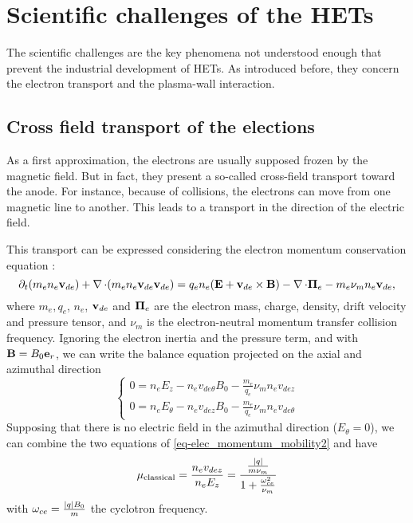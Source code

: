 
\section*{Scientific challenges of the HETs}

The scientific challenges are the key phenomena not understood enough that prevent the industrial development of \ac{HET}s.
As introduced before, they concern the electron transport and the plasma-wall interaction.

\subsection*{Cross field transport of the elections}

  \label{sec-mob}
  As a first approximation, the electrons are usually supposed frozen by the magnetic field.
  But in fact, they present a so-called cross-field transport toward the anode.
  For instance, because of collisions, the electrons can move from one magnetic line to another.
  This leads to a transport in the direction of the electric field.
  
  This transport can be expressed considering the electron momentum conservation equation \citep{lafleur2016a}\string:
  \begin{equation} \label{eq-elec_momentum_mobility}
    \partial_t(m_e n_e {\mathbf v}_{de}) + \operatorname{{\mathbf \nabla}} \cdot (m_e n_e  {\mathbf v}_{de} {\mathbf v}_{de}) = q_e n_e ( {\mathbf E} + {\mathbf v}_{de} \times {\mathbf B}) - \operatorname{{\mathbf \nabla}} \cdot {\mathbf \Pi}_e - m_e \nu_m n_e {\mathbf v}_{de},
  \end{equation}
  where $m_e, q_e$, $n_e$, ${\mathbf v}_{de}$ and ${\mathbf \Pi}_e $ are the electron mass, charge, density, drift velocity and pressure tensor, and $\nu_m$ is the electron-neutral momentum transfer collision frequency.
  Ignoring the electron inertia and the pressure term, and with ${\mathbf B} = B_0 {\mathbf e}_r$, we can write the balance equation projected on the axial and azimuthal direction
  \begin{equation} \label{eq-elec_momentum_mobility2}
  \begin{cases}
    0 =  n_e E_z - n_e v_{de{\theta}} B_0 - \frac{m_e}{q_e} \nu_m n_e v_{dez}\\
    0 =  n_e E_{\theta} -  n_e v_{dez} B_0 - \frac{m_e}{q_e} \nu_m n_e v_{de{\theta}}
  \end{cases}
  \end{equation}
  Supposing that there is no electric field in the azimuthal direction ($E_{\theta}=0$),  we can combine the two equations of \cref{eq-elec_momentum_mobility2} and have \citep{chen2006,meezan2001}
  \begin{equation} \label{eq-mobility}
    \mu_{\mathrm{classical}} = \frac{n_e v_{dez}}{n_e E_z} = \frac{ \frac{\lvert q\rvert}{m \nu_m}}{1 + \frac{\omega_{ce}^2}{\nu_m}}
  \end{equation}
  with $\omega_{ce}= \frac{\lvert q\rvert B_0}{m}$ the cyclotron frequency.
  
